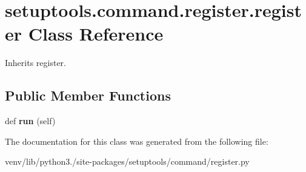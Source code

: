 \hypertarget{classsetuptools_1_1command_1_1register_1_1register}{}\section{setuptools.\+command.\+register.\+register Class Reference}
\label{classsetuptools_1_1command_1_1register_1_1register}


Inherits register.

\subsection*{Public Member Functions}
\begin{DoxyCompactItemize}
\item 
\mbox{\label{classsetuptools_1_1command_1_1register_1_1register_a621e5757f6735b719df3425069768eb9}} 
def {\bfseries run} (self)
\end{DoxyCompactItemize}


The documentation for this class was generated from the following file\+:\begin{DoxyCompactItemize}
\item 
venv/lib/python3./site-\/packages/setuptools/command/register.\+py\end{DoxyCompactItemize}
